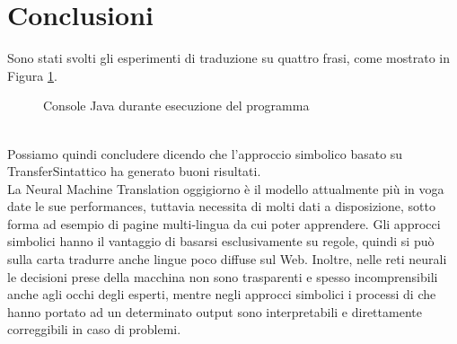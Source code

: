 \section{Conclusioni}
Sono stati svolti gli esperimenti di traduzione su quattro frasi, come mostrato in Figura \ref{console}.
\begin{figure}[ht]
	\centering 
	  
	\caption{Console Java durante esecuzione del programma}
	\label{console}
\end{figure}
\\ Possiamo quindi concludere dicendo che l'approccio simbolico basato su TransferSintattico ha generato buoni risultati. \\
La Neural Machine Translation oggigiorno è il modello attualmente più in voga date le sue performances, tuttavia necessita di molti dati a disposizione, sotto forma ad esempio di pagine multi-lingua da cui poter apprendere. Gli approcci simbolici hanno il vantaggio di basarsi esclusivamente su regole, quindi si può sulla carta tradurre anche lingue poco diffuse sul Web. Inoltre, nelle reti neurali
le decisioni prese della macchina non sono trasparenti e spesso incomprensibili anche agli occhi degli esperti, mentre negli approcci simbolici i processi di che hanno portato ad un determinato output sono interpretabili e direttamente correggibili in caso di problemi.